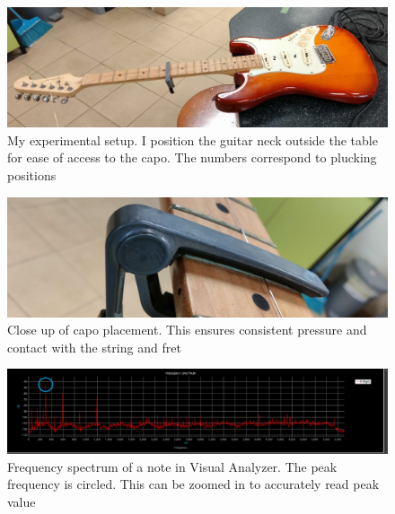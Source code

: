 \begin{figure}[!htbp]
    \includegraphics[width = \textwidth]{ee/experiment_setup.jpg}
    \caption{My experimental setup. I position the guitar neck outside the table for ease of access to the capo. The numbers correspond to plucking positions} \label{fig4}
\end{figure}
\begin{figure}[!htbp]
    \includegraphics[width = \textwidth]{ee/capo_on_fret.jpg}
    \caption{Close up of capo placement. This ensures consistent pressure and contact with the string and fret} \label{fig5}
\end{figure}
\begin{figure}[!htbp]
    \includegraphics[width = \textwidth]{./ee/freq.png}
    \caption{Frequency spectrum of a note in Visual Analyzer. The peak frequency is circled. This can be zoomed in to accurately read peak value} \label{fig6}
\end{figure}